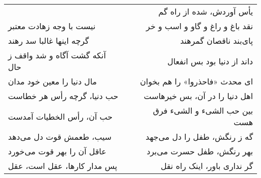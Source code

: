 \begin{center}
\begin{longtable}{l p{0.5cm} r}
&&
یأس آوردش، شده از راه گم
\\
نیست با وجه زهادت معتبر
&&
نقد باغ و راغ و گاو و اسب و خر
\\
گرچه اینها غالبا سد رهند
&&
پای‌بند ناقصان گمرهند
\\
آنکه گشت آگاه و شد واقف ز حال
&&
داند از دنیا بود بس انفعال
\\
مال دنیا را معین خود مدان
&&
ای محدث «فاحذروا» را هم بخوان
\\
حب دنیا، گرچه رأس هر خطاست
&&
اهل دنیا را در آن، بس خیرهاست
\\
حب آن، رأس الخطیات آمدست
&&
بین حب الشیء و الشیء فرق هست
\\
سیب، طعمش قوت دل می‌دهد
&&
گه ز رنگش، طفل را دل می‌جهد
\\
عاقل آن را بهر قوت می‌خورد
&&
بهر رنگش، طفل حسرت می‌برد
\\
پس مدار کارها، عقل است، عقل
&&
گر نداری باور، اینک راه نقل
\\
\end{longtable}
\end{center}
